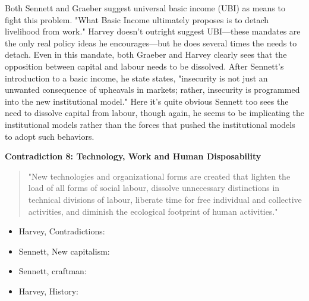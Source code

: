 \documentclass[12pt,a4paper]{article}
\begin{document}
Both Sennett and Graeber suggest universal basic income (UBI) as means to fight this problem. "What Basic Income ultimately proposes is to detach livelihood from work." \cite{bs}  Harvey doesn't outright suggest UBI---these mandates are the only real policy ideas he encourages---but he does several times the needs to detach. Even in this mandate, both Graeber and Harvey clearly sees that the opposition between capital and labour needs to be dissolved. After Sennett's introduction to a basic income, he state states, "insecurity is not just an unwanted consequence of upheavals in markets; rather, insecurity is programmed into the new institutional model." \cite{new} Here it's quite obvious Sennett too sees the need to dissolve capital from labour, though again, he seems to be implicating the institutional models rather than the forces that pushed the institutional models to adopt such behaviors.

\textbf{Contradiction 8: Technology, Work and Human Disposability}
\begin{quotation} {\color{G-Moon}
    \noindent "New technologies and organizational forms are created that lighten the load of all forms of social labour, dissolve unnecessary distinctions in technical divisions of labour, liberate time for free individual and collective activities, and diminish the ecological footprint of human activities." \cite{con}}
\end{quotation}










\newpage
\begin{itemize}
    \item Harvey, Contradictions: \cite{con}
    \item Sennett, New capitalism: \cite{new}
    \item Sennett, craftman: \cite{craft}
    \item Harvey, History: \cite{neo}
\end{itemize}

\clearpage


\end{document}
